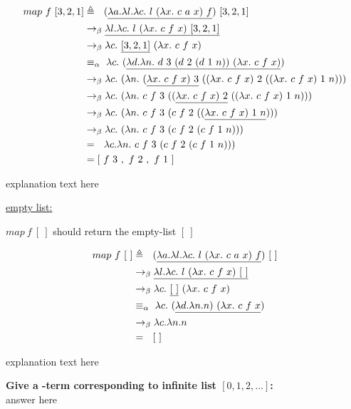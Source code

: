 \documentclass{article}
\begin{document}
\begin{Large}
		\begin{align*}
			map \ f \ [3,2,1] &\triangleq \saq (\underline{\la a.\la l.\la c. \ l \ (\la x.\ c \ a \ x) \ f}) \ [3,2,1] \\
			&\equals \underline{\la l.\la c. \ l \ (\la x.\ c \ f \ x) \ [3,2,1]} \\
			&\equals \la c. \ \underline{[3,2,1]} \ (\la x.\ c \ f \ x) \\
			&\equiv_\alpha \, \, \la c. \  (\underline{\la d.\la n. \ d \ 3 \ (d \ 2 \ (d \ 1 \ n)) \ (\la x.\ c \ f \ x)}) \\
			&\equals \la c. \  (\la n. \ (\underline{\la x.\ c \ f \ x) \ 3} \ ((\la x.\ c \ f \ x) \ 2 \ ((\la x.\ c \ f \ x) \ 1 \ n))) \\
			&\equals \la c. \  (\la n. \ c\ f \ 3 \ ((\underline{\la x.\ c \ f \ x) \ 2} \ ((\la x.\ c \ f \ x) \ 1 \ n))) \\
			&\equals \la c. \  (\la n. \ c\ f \ 3 \ (c \ f \ 2 \ ((\underline{\la x.\ c \ f \ x) \ 1 \ n}))) \\
			&\equals \la c. \  (\la n. \ c\ f \ 3 \ (c \ f \ 2 \ (c \ f \ 1 \ n))) \\
			&= \saq \la c.\la n. \ c\ f \ 3 \ (c \ f \ 2 \ (c \ f \ 1 \ n))) \\
			&= [\ f \ 3 \ , \ f \ 2 \ , \  f \ 1\ ]
		\end{align*}
		
		explanation text here
		\newline
		
		\underline{empty list:}
		\newline
		
		$map \ f \ [ \ ]$ should return the empty-list $[ \ ]$
		
		\begin{align*}
			map \ f \ [ \ ] &\triangleq \saq (\underline{\la a.\la l.\la c. \ l \ (\la x.\ c \ a \ x) \ f}) \ [ \ ] \\
			&\equals \underline{\la l.\la c. \ l \ (\la x.\ c \ f \ x) \ [ \ ]} \\
			&\equals \la c. \ \underline{[ \ ]} \ (\la x.\ c \ f \ x) \\
			&\equiv_\alpha \, \, \la c. \ (\underline{\la d.\la n.n) \ (\la x.\ c \ f \ x}) \\
			&\equals \la c.\la n.n \\
			&= \saq [ \ ]
		\end{align*}
		\newline
		
		explanation text here
		\newline
		
		
		\textbf{Give a \lamb -term corresponding to infinite list $[0,1,2,...]$:}\\
		
		answer here
	\end{Large}
	
\end{document}
